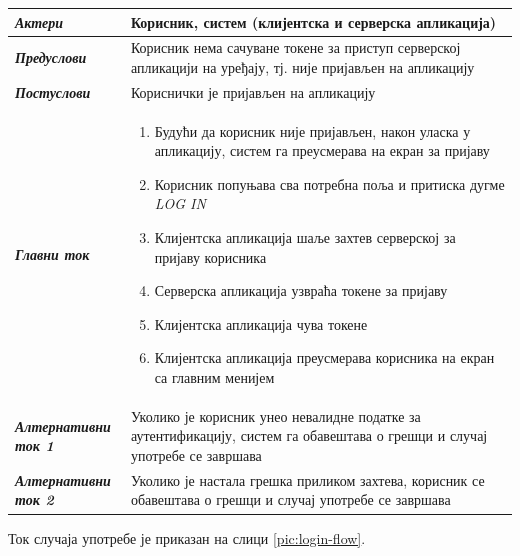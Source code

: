\documentclass[12pt,oneside]{memoir}
\begin{document}
\begin{longtable}{p{0.23\linewidth} p{0.77\linewidth}}
 \hline
 \textit{\textbf{Актери}} & Корисник, систем (клијентска и серверска апликација) \\
\hline

\textit{\textbf{Предуслови}} & Корисник нема сачуване токене за приступ серверској апликацији на уређају, тј. није пријављен на апликацију \\
 \hline
\textit{\textbf{Постуслови}} & Кориснички је пријављен на апликацију \\
 \hline
 \textit{\textbf{Главни ток}} &  
    \begin{enumerate}
        \item Будући да корисник није пријављен, након уласка у апликацију, систем га преусмерава на екран за пријаву 
        \item Корисник попуњава сва потребна поља и притиска дугме \textit{LOG IN} 
        \item Клијентска апликација шаље захтев серверској за пријаву корисника 
        \item Серверска апликација узвраћа токене за пријаву
        \item Клијентска апликација чува токене
        \item Клијентска апликација преусмерава корисника на екран са главним менијем
    \end{enumerate}\\
 \hline
\textit{\textbf{Алтернативни ток 1}} & Уколико је корисник унео невалидне податке за аутентификацију, систем га обавештава о грешци и случај употребе се завршава \\
 \hline
\textit{\textbf{Алтернативни ток 2}} & Уколико је настала грешка приликом захтева, корисник се обавештава о грешци и случај употребе се завршава \\
 \hline
\end{longtable}

\noindent Ток случаја употребе је приказан на слици \ref{pic:login-flow}.
\end{document}
